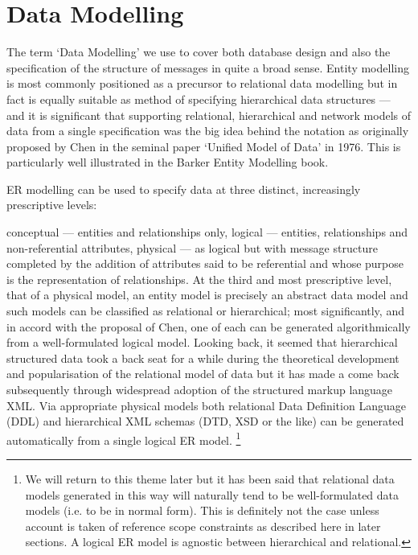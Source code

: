 \section{Data Modelling}
The term ‘Data Modelling’ we use to cover both database design and also the specification of the structure of messages in quite a broad sense. Entity modelling is most commonly positioned as a precursor to relational data modelling but in fact is equally suitable as method of specifying hierarchical data structures — and it is significant that supporting relational, hierarchical and network models of data from a single specification was the big idea behind the notation as originally proposed by Chen in the seminal paper ‘Unified Model of Data’ in 1976. This is particularly well illustrated in the Barker Entity Modelling book.

ER modelling can be used to specify data at three distinct, increasingly prescriptive levels:

conceptual — entities and relationships only,
logical — entities, relationships and non-referential attributes,
physical — as logical but with message structure completed by the addition of attributes said to be referential and whose purpose is the representation of relationships.
At the third and most prescriptive level, that of a physical model, an entity model is precisely an abstract data model and such models can be classified as relational or hierarchical; most significantly, and in accord with the proposal of Chen, one of each can be generated algorithmically from a well-formulated logical model. Looking back, it seemed that hierarchical structured data took a back seat for a while during the theoretical development and popularisation of the relational model of data but it has made a come back subsequently through widespread adoption of the structured markup language XML. Via appropriate physical models both relational Data Definition Language (DDL) and hierarchical XML schemas (DTD, XSD or the like) can be generated automatically from a single logical ER model. \footnote{We will return to this theme later but it has been said that relational data models generated in this way will naturally tend to be well-formulated data models (i.e. to be in normal form). This is definitely not the case unless account is taken of reference scope constraints as described here in later sections. A logical ER model is agnostic between hierarchical and relational.}

